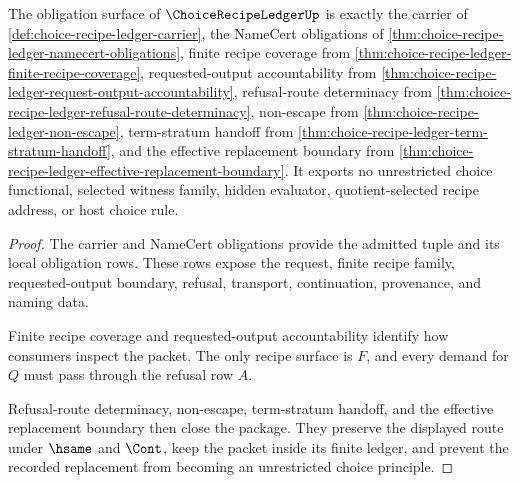 \begin{theorem}
\label{thm:choice-recipe-ledger-obligation-closure-package}
The obligation surface of $\ChoiceRecipeLedgerUp$ is exactly the carrier of \autoref{def:choice-recipe-ledger-carrier}, the NameCert obligations of \autoref{thm:choice-recipe-ledger-namecert-obligations}, finite recipe coverage from \autoref{thm:choice-recipe-ledger-finite-recipe-coverage}, requested-output accountability from \autoref{thm:choice-recipe-ledger-request-output-accountability}, refusal-route determinacy from \autoref{thm:choice-recipe-ledger-refusal-route-determinacy}, non-escape from \autoref{thm:choice-recipe-ledger-non-escape}, term-stratum handoff from \autoref{thm:choice-recipe-ledger-term-stratum-handoff}, and the effective replacement boundary from \autoref{thm:choice-recipe-ledger-effective-replacement-boundary}. It exports no unrestricted choice functional, selected witness family, hidden evaluator, quotient-selected recipe address, or host choice rule.
\end{theorem}
\begin{proof}
The carrier and NameCert obligations provide the admitted tuple and its local obligation rows. These rows expose the request, finite recipe family, requested-output boundary, refusal, transport, continuation, provenance, and naming data.

Finite recipe coverage and requested-output accountability identify how consumers inspect the packet. The only recipe surface is $F$, and every demand for $Q$ must pass through the refusal row $A$.

Refusal-route determinacy, non-escape, term-stratum handoff, and the effective replacement boundary then close the package. They preserve the displayed route under $\hsame$ and $\Cont$, keep the packet inside its finite ledger, and prevent the recorded replacement from becoming an unrestricted choice principle.
\end{proof}

